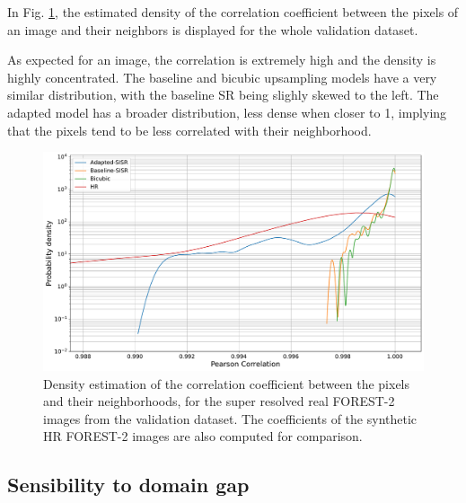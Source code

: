         In Fig. \ref{fig:5-correlation-histogram-validation-dataset}, the estimated density of the correlation coefficient between the pixels of an image and their neighbors is displayed for the whole validation dataset. 
        
        As expected for an image, the correlation is extremely high and the density is highly concentrated. The baseline and bicubic upsampling models have a very similar distribution, with the baseline SR being slighly skewed to the left.
        The adapted model has a broader distribution, less dense when closer to 1, implying that the pixels tend to be less correlated with their neighborhood. 
        
        \begin{figure}[H]
            \centering
            \includegraphics[scale=0.35]{Includes/5-correlation-histogram-validation-dataset.pdf}
            \caption{Density estimation of the correlation coefficient between the pixels and their neighborhoods, for the super resolved real FOREST-2 images from the validation dataset. The coefficients of the synthetic HR FOREST-2 images are also computed for comparison.}
            \label{fig:5-correlation-histogram-validation-dataset}
        \end{figure}

    \subsection{Sensibility to domain gap}




